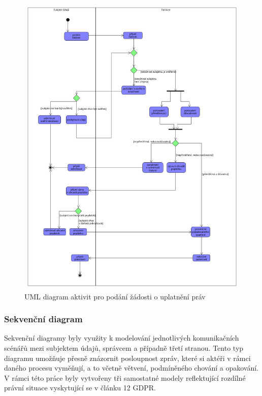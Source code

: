 \begin{itemize}
  \begin{figure}[H]
    \centering
    \includegraphics[width=\textwidth]{images/UML_activity_zadost.png}
    \caption{UML diagram aktivit pro podání žádosti o uplatnění práv}
    \label{fig:uml_activity_zadost}
  \end{figure}

\end{itemize}


\subsubsection{Sekvenční diagram}
\label{sec:uml-sekvencni-diagram}

Sekvenční diagramy byly využity k modelování jednotlivých komunikačních scénářů mezi subjektem údajů, správcem a případně třetí stranou. Tento typ diagramu umožňuje přesně znázornit posloupnost zpráv, které si aktéři v rámci daného procesu vyměňují, a to včetně větvení, podmíněného chování a opakování. V rámci této práce byly vytvořeny tři samostatné modely reflektující rozdílné právní situace vyskytující se v článku 12 GDPR.

